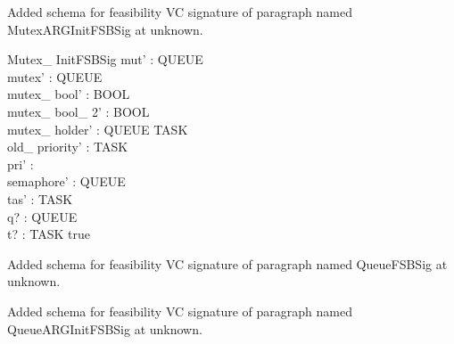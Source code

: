 \documentclass{article}
\begin{document}
Added schema for feasibility VC signature of paragraph named MutexARGInitFSBSig at unknown.
\begin{schema}{Mutex\_ InitFSBSig}
mut' : QUEUE \\
 mutex' : \power QUEUE \\
 mutex\_ bool' : BOOL \\
 mutex\_ bool\_ 2' : BOOL \\
 mutex\_ holder' : QUEUE \pfun TASK \\
 old\_ priority' : TASK \pfun \nat \\
 pri' : \nat \\
 semaphore' : \power QUEUE \\
 tas' : TASK \\
 q? : QUEUE \\
 t? : TASK 
\where
 true
\end{schema}


Added schema for feasibility VC signature of paragraph named QueueFSBSig at unknown.


Added schema for feasibility VC signature of paragraph named QueueARGInitFSBSig at unknown.
\end{document}
